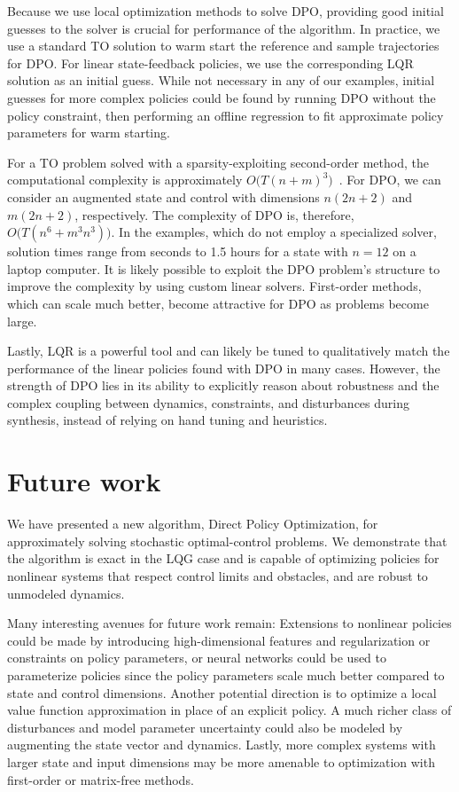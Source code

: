 Because we use local optimization methods to solve DPO, providing good initial guesses to the solver is crucial for performance of the algorithm. In practice, we use a standard TO solution to warm start the reference and sample trajectories for DPO. For linear state-feedback policies, we use the corresponding LQR solution as an initial guess. While not necessary in any of our examples, initial guesses for more complex policies could be found by running DPO without the policy constraint, then performing an offline regression to fit approximate policy parameters for warm starting. 

For a TO problem solved with a sparsity-exploiting second-order method, the computational complexity is approximately $O\Big( T (n + m)^3 \Big)$~\cite{wang2009fast}. For DPO, we can consider an augmented state and control with dimensions $n(2n + 2)$ and $m(2n + 2)$, respectively. The complexity of DPO is, therefore, $O\Big( T (n^6 + m^3n^3) \Big)$. In the examples, which do not employ a specialized solver, solution times range from seconds to 1.5 hours for a state with $n = 12$ on a laptop computer. It is likely possible to exploit the DPO problem's structure to improve the complexity by using custom linear solvers. First-order methods, which can scale much better, become attractive for DPO as problems become large.

Lastly, LQR is a powerful tool and can likely be tuned to qualitatively match the performance of the linear policies found with DPO in many cases. However, the strength of DPO lies in its ability to explicitly reason about robustness and the complex coupling between dynamics, constraints, and disturbances during synthesis, instead of relying on hand tuning and heuristics.

\section{Future work}\label{dpo_future_work}

We have presented a new algorithm, Direct Policy Optimization, for approximately solving stochastic optimal-control problems. We demonstrate that the algorithm is exact in the LQG case and is capable of optimizing policies for nonlinear systems that respect control limits and obstacles, and are robust to unmodeled dynamics.

Many interesting avenues for future work remain: Extensions to nonlinear policies could be made by introducing high-dimensional features and regularization or constraints on policy parameters, or neural networks could be used to parameterize policies since the policy parameters scale much better compared to state and control dimensions. Another potential direction is to optimize a local value function approximation in place of an explicit policy. A much richer class of disturbances and model parameter uncertainty could also be modeled by augmenting the state vector and dynamics. Lastly, more complex systems with larger state and input dimensions may be more amenable to optimization with first-order or matrix-free methods.

